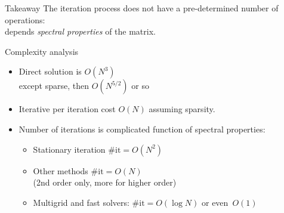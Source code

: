 \begin{frame}{Takeaway}
  The iteration process does not have a pre-determined number of
  operations:\\
  depends \emph{spectral properties} of the matrix.
\end{frame}

\begin{frame}{Complexity analysis}
\begin{itemize}
\item Direct solution is $O(N^3)$\\
  except sparse, then $O(N^{5/2})$ or so
\item Iterative per iteration cost $O(N)$ assuming sparsity.
\item Number of iterations is complicated function of spectral properties:
  \begin{itemize}
  \item Stationary iteration $\#\mathrm{it}=O(N^2)$
  \item Other methods $\#\mathrm{it}=O(N)$\\
    (2nd order only, more for higher order)
  \item Multigrid and fast solvers: $\#\mathrm{it}=O(\log N)$ or even~$O(1)$
  \end{itemize}
\end{itemize}
\end{frame}




